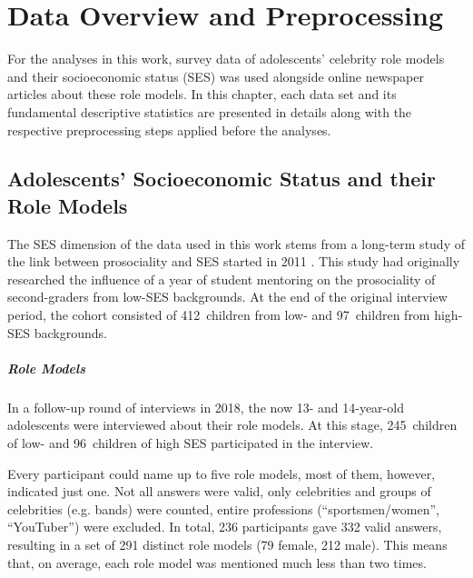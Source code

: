 \renewcommand{\imagepath}{../30-mot/img}

\chapter{Data Overview and Preprocessing}
For the analyses in this work, survey data of adolescents' celebrity role models and their socioeconomic status (SES) was used alongside online newspaper articles about these role models. In this chapter, each data set and its fundamental descriptive statistics are presented in details along with the respective preprocessing steps applied before the analyses.

\section{Adolescents' Socioeconomic Status and their Role Models}
The SES dimension of the data used in this work stems from a long-term study of the link between prosociality and SES started in 2011 \autocite{kosse_formation_2020}. This study had originally researched the influence of a year of student mentoring on the prosociality of second-graders from low-SES backgrounds. At the end of the original interview period, the cohort consisted of \SI{412}{children} from low- and \SI{97}{children} from high-SES backgrounds.

\paragraph{Role Models }
In a follow-up round of interviews in 2018, the now 13- and 14-year-old adolescents were interviewed about their role models. At this stage, \SI{245}{children} of low- and \SI{96}{children} of high SES participated in the interview.

Every participant could name up to five role models, most of them, however, indicated just one. Not all answers were valid, only celebrities and groups of celebrities (e.g. bands) were counted, entire professions (``sportsmen/women'', ``YouTuber'') were excluded. In total, \SI{236}{} participants gave \SI{332}{} valid answers, resulting in a set of \SI{291}{} distinct role models (\SI{79}{} female, \SI{212}{} male). This means that, on average, each role model was mentioned much less than two times.

